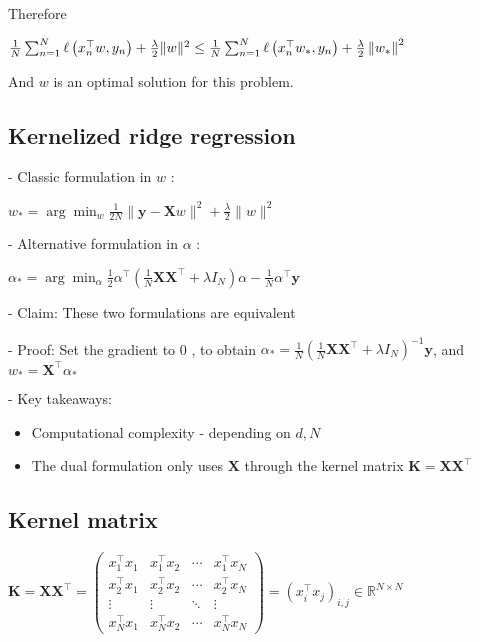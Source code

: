Therefore

$
\frac{1}{N} \sum_{n=1}^{N} \ell\left(x_{n}^{\top} w, y_{n}\right)+\frac{\lambda}{2}\|w\|^{2} \\\leq \frac{1}{N} \sum_{n=1}^{N} \ell\left(x_{n}^{\top} w_{*}, y_{n}\right)+\frac{\lambda}{2}\left\|w_{*}\right\|^{2}
$

And $w$ is an optimal solution for this problem.

\subsection*{Kernelized ridge regression}
- Classic formulation in $w$ :

$
w_{*}=\arg \min _{w} \frac{1}{2 N}\|\mathbf{y}-\mathbf{X} w\|^{2}+\frac{\lambda}{2}\|w\|^{2}
$

- Alternative formulation in $\alpha$ :

$
\alpha_{*}=\arg \min _{\alpha} \frac{1}{2} \alpha^{\top}\left(\frac{1}{N} \mathbf{X} \mathbf{X}^{\top}+\lambda I_{N}\right) \alpha-\frac{1}{N} \alpha^{\top} \mathbf{y}
$

- Claim: These two formulations are equivalent

- Proof: Set the gradient to 0 , to obtain $\alpha_{*}=\frac{1}{N}\left(\frac{1}{N} \mathbf{X} \mathbf{X}^{\top}+\lambda I_{N}\right)^{-1} \mathbf{y}$, and $w_{*}=\mathbf{X}^{\top} \alpha_{*}$

- Key takeaways:

\begin{itemize}
  \item Computational complexity - depending on $d, N$
  \item The dual formulation only uses $\mathbf{X}$ through the kernel matrix $\mathbf{K}=\mathbf{X X}^{\top}$
\end{itemize}

\subsection*{Kernel matrix}
$
\mathbf{K}=\mathbf{X} \mathbf{X}^{\top}=\left(\begin{array}{cccc}
x_{1}^{\top} x_{1} & x_{1}^{\top} x_{2} & \cdots & x_{1}^{\top} x_{N} \\
x_{2}^{\top} x_{1} & x_{2}^{\top} x_{2} & \cdots & x_{2}^{\top} x_{N} \\
\vdots & \vdots & \ddots & \vdots \\
x_{N}^{\top} x_{1} & x_{N}^{\top} x_{2} & \cdots & x_{N}^{\top} x_{N}
\end{array}\right)=\left(x_{i}^{\top} x_{j}\right)_{i, j} \in \mathbb{R}^{N \times N}
$

